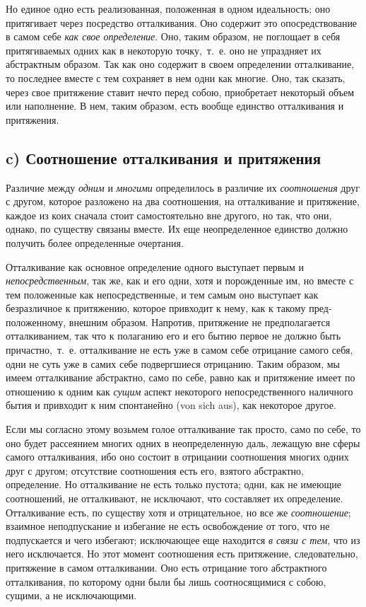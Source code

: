 Но единое одно есть реализованная, положенная в одном идеальность; оно
притягивает через посредство отталкивания. Оно содержит это
опосредствование в самом себе {\em как свое
определение}. Оно, таким образом, не поглощает в себя притягиваемых одних
как в некоторую точку,~т.~е. оно не упраздняет их абстрактным образом. Так
как оно содержит в своем определении отталкивание, то последнее вместе с
тем сохраняет в нем одни как многие. Оно, так сказать, через свое
притяжение ставит нечто перед собою, приобретает некоторый объем или
наполнение. В нем, таким образом, есть вообще единство отталкивания и
притяжения.

\subsection*{c) Соотношение отталкивания и притяжения}
Различие между {\em одним} и
{\em многими} определилось в различие их
{\em соотношения} друг с другом, которое разложено на
два соотношения, на отталкивание и притяжение, каждое из коих сначала стоит
самостоятельно вне другого, но так, что они, однако, по существу связаны
вместе. Их еще неопределенное единство должно получить более определенные
очертания.

Отталкивание как основное определение одного выступает первым и
{\em непосредственным}, так же, как и его одни, хотя и
порожденные им, но вместе с тем положенные как непосредственные, и тем
самым оно выступает как безразличное к притяжению, которое привходит к
нему, как к такому пред-положенному, внешним образом. Напротив, притяжение
не предполагается отталкиванием, так что к полаганию его и его бытию первое
не должно быть причастно,~т.~е. отталкивание не есть уже в самом себе
отрицание самого себя, одни не суть уже в самих себе подвергшиеся
отрицанию. Таким образом, мы имеем отталкивание абстрактно, само по себе,
равно как и притяжение имеет по отношению к одним как
{\em сущим} аспект некоторого непосредственного
наличного бытия и привходит к ним спонтанейно (von sich aus), как некоторое
другое.

Если мы согласно этому возьмем голое отталкивание так просто, само по себе,
то оно будет рассеянием многих одних в неопределенную даль, лежащую вне
сферы самого отталкивания, ибо оно состоит в отрицании соотношения многих
одних друг с другом; отсутствие соотношения есть его, взятого абстрактно,
определение. Но отталкивание не есть только пустота; одни, как не имеющие
соотношений, не отталкивают, не исключают, что составляет их определение.
Отталкивание есть, по существу хотя и отрицательное, но все же
{\em соотношение}; взаимное неподпускание и избегание
не есть освобождение от того, что не подпускается и чего избегают;
исключающее еще находится {\em в связи с тем}, что из
него исключается. Но этот момент соотношения есть притяжение,
следовательно, притяжение в самом отталкивании. Оно есть отрицание того
абстрактного отталкивания, по которому одни были бы лишь соотносящимися с
собою, сущими, а не исключающими.


